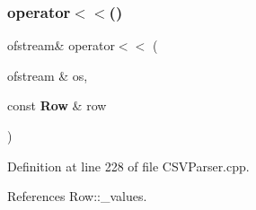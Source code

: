 \mbox{\label{_c_s_v_parser_8cpp_ad4e8b6c4b0238a50bde8e99ec8a0dcb0}} 
\subsubsection{operator$<$$<$()\hspace{0.1cm}{\footnotesize\ttfamily [2/2]}}
{\footnotesize\ttfamily ofstream\& operator$<$$<$ (\begin{DoxyParamCaption}\item[{ofstream \&}]{os,  }\item[{const \textbf{ Row} \&}]{row }\end{DoxyParamCaption})}



Definition at line 228 of file C\+S\+V\+Parser.\+cpp.



References Row\+::\+\_\+values.

